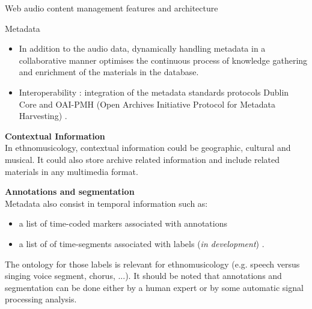 \documentclass[final, hyperref, table]{beamer}
\begin{document}
\begin{frame}[containsverbatim]{}
\begin{columns}[T]
\begin{column}[T]{.49\linewidth}
\begin{block}{Web audio content management features and architecture}
      \end{block}
      \begin{block}{Metadata}
        \vspace{-0.5cm}
        \begin{itemize}
        \item In addition to the audio data, dynamically handling metadata in a \alert{collaborative} manner optimises
          the continuous process of knowledge gathering and enrichment of
          the materials in the database.
        \item Interoperability : integration of the metadata standards protocols \alert{Dublin Core}
          and \alert{OAI-PMH} (Open Archives Initiative Protocol for Metadata
          Harvesting) \cite{DublinCore,OAI-PMH}.
        \end{itemize}
        
        \textbf{Contextual Information}\\
        In ethnomusicology, contextual information could be geographic, cultural and musical. It could also store archive related information and include related materials in any multimedia format. 
        
        \textbf{Annotations and segmentation}\\
        Metadata also consist in temporal information such as:
        \begin{itemize}
        \item a list of \alert{time-coded markers} associated with annotations
        \item a list of of \alert{time-segments} associated with labels (\emph{in development}) .
        \end{itemize}
        The ontology for those labels is relevant for ethnomusicology (e.g. speech versus singing voice segment, chorus, ...).
        It should be noted that annotations and segmentation can be done either by a human expert or by some automatic signal processing analysis.
      \end{block}
      

\end{column}
\end{columns}
\end{frame}
\end{document}
